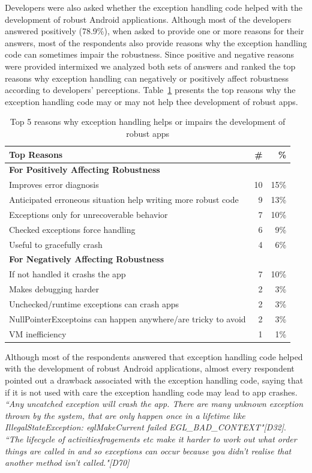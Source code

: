 \bigskip

Developers were also asked whether the exception handling code helped with the development of robust Android applications. Although most of the developers answered positively (78.9\%), when asked to provide one or more reasons for their answers, most of the respondents also provide reasons why the exception handling code can sometimes impair the robustness.  Since positive and negative reasons were provided intermixed we analyzed both sets of answers and ranked the top reasons why exception handling can negatively or positively affect robustness according to developers' perceptions. Table~\ref{tab:topreasons} presents the top reasons why the exception handling code may or may not help thee development of robust apps. 

\begin{table}
\scriptsize
\centering
\begin{tabular}{lrr}
\hline
\bfseries{Top Reasons} & \bfseries{\#} & \bfseries{\%} \\
\hline
\bfseries{For Positively Affecting Robustness} &   &   \\
Improves error diagnosis  &	10	& 15\% \\
Anticipated erroneous situation help writing more robust code  & 9	 & 13\% \\ 
Exceptions only for unrecoverable behavior	& 7 &	10\% \\
Checked exceptions force handling  &	6	& 9\% \\
Useful to gracefully crash 	& 4 &	6\% \\
		
\bfseries{For Negatively Affecting Robustness} &   &   \\
If not handled it crashs the app	 & 7	& 10\% \\
Makes debugging harder &	2 &	3\% \\
Unchecked/runtime exceptions can crash apps & 2	& 3\% \\
NullPointerExceptoins can happen anywhere/are tricky to avoid	 & 2	& 3\% \\
VM inefficiency 	& 1 & 1\% \\

\hline
\end{tabular}
\caption{Top 5 reasons why exception handling helps or impairs the development of robust apps}
\label{tab:topreasons}
\end{table}


Although most of the respondents answered that exception handling code helped with the development of robust Android applications, almost every respondent pointed out a drawback associated with the exception handling code, saying that if it is not used with care the exception handling code may lead to app crashes. \emph{``Any uncatched exception will crash the app. There are many unknown exception thrown by the system, that are only happen once in a lifetime like IllegalStateException: eglMakeCurrent failed EGL\_BAD\_CONTEXT"[D32]}. \emph{``The lifecycle of activities\/fragements etc make it harder to work out what order things are called in and so exceptions can occur because you didn't realise that another method isn't called."[D70]}

